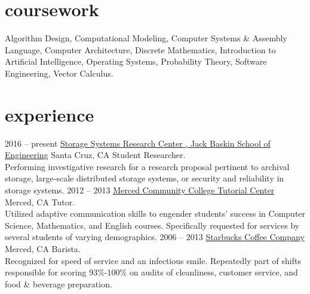 \documentclass[]{./friggeri-cv}
\begin{document}
\section{coursework}
Algorithm Design, %
Computational Modeling, %
Computer Systems \& Assembly Language, %
Computer Architecture, %
Discrete Mathematics, %
Introduction to Artificial Intelligence, %
Operating Systems, %
Probability Theory, %
Software Engineering, %
Vector Calculus. %
\section{experience}
\begin{entrylist}
\entry
    {2016 -- present}
    {\href{http://www.ssrc.ucsc.edu/index.html}{Storage Systems Research Center%
    , Jack Baskin School of Engineering}}
    {Santa Cruz, CA}
    {{\rolefont Student Researcher.}\\Performing investigative research for a
    research proposal pertinent to archival storage, large-scale distributed
    storage systems, or security and reliability in storage systems.}
\entry
    {2012 -- 2013}
    {\href{http://www.mccd.edu/resources/tutoring/tutorial-center.html}{Merced Community College Tutorial Center}}
    {Merced, CA}
    {{\rolefont Tutor.}\\Utilized adaptive communication skills to engender students'
    success in Computer Science, Mathematics, and English courses. Specifically 
    requested for services by several students of varying demographics.}
\entry
    {2006 -- 2013}
    {\href{http://wisequacks.org/wp2/wp-content/uploads/2012/05/coffee.jpg}{Starbucks Coffee Company}}
    {Merced, CA}
    {{\rolefont Barista.}\\Recognized for speed of service and an infectious smile.
    Repeatedly part of shifts responsible for scoring 93\%-100\% on audits of
    cleanliness, customer service, and food \& beverage preparation.}
\end{entrylist}
\end{document}
